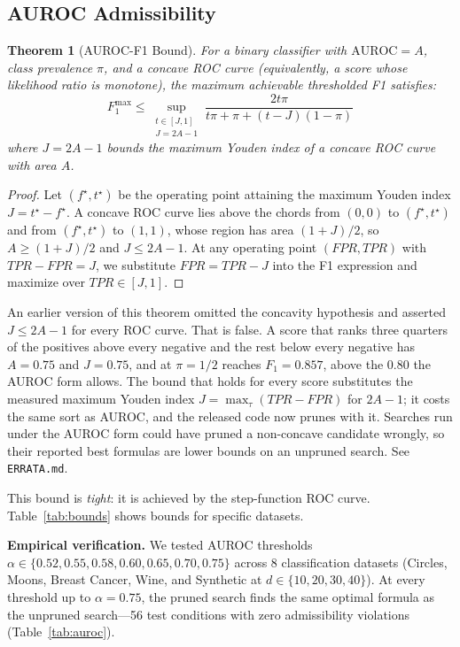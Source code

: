 \documentclass[journal]{IEEEtran}
\newtheorem{theorem}{Theorem}
\begin{document}
\subsection{AUROC Admissibility}

\begin{theorem}[AUROC-F1 Bound]
\label{thm:auroc_f1}
For a binary classifier with $\mathrm{AUROC} = A$, class
prevalence $\pi$, and a \emph{concave} ROC curve (equivalently, a score
whose likelihood ratio is monotone), the maximum achievable thresholded
F1 satisfies:
\[
F_1^{\max} \leq \sup_{\substack{t \in [J, 1] \\ J = 2A-1}}
\frac{2 t \pi}{t \pi + \pi + (t - J)(1 - \pi)}
\]
where $J = 2A - 1$ bounds the maximum Youden index of a concave ROC
curve with area $A$.
\end{theorem}

\begin{proof}
Let $(f^\star, t^\star)$ be the operating point attaining the maximum
Youden index $J = t^\star - f^\star$. A concave ROC curve lies above the
chords from $(0,0)$ to $(f^\star,t^\star)$ and from $(f^\star,t^\star)$ to
$(1,1)$, whose region has area $(1+J)/2$, so $A \ge (1+J)/2$ and $J \le
2A-1$. At any operating point
$(FPR, TPR)$ with $TPR - FPR = J$, we substitute $FPR = TPR - J$
into the F1 expression and maximize over $TPR \in [J, 1]$.
\end{proof}

\begin{remark}[Correction, 2026-09-03]
An earlier version of this theorem omitted the concavity hypothesis and
asserted $J \le 2A-1$ for every ROC curve. That is false. A score that
ranks three quarters of the positives above every negative and the rest
below every negative has $A = 0.75$ and $J = 0.75$, and at $\pi = 1/2$
reaches $F_1 = 0.857$, above the $0.80$ the AUROC form allows. The bound
that holds for every score substitutes the measured maximum Youden index
$J = \max_\tau(TPR-FPR)$ for $2A-1$; it costs the same sort as AUROC, and
the released code now prunes with it. Searches run under the AUROC form
could have pruned a non-concave candidate wrongly, so their reported best
formulas are lower bounds on an unpruned search. See \texttt{ERRATA.md}.
\end{remark}

This bound is \emph{tight}: it is achieved by the step-function ROC
curve. Table~\ref{tab:bounds} shows bounds for specific datasets.

\textbf{Empirical verification.} We tested AUROC thresholds
$\alpha \in \{0.52, 0.55, 0.58, 0.60, 0.65, 0.70, 0.75\}$ across
8 classification datasets (Circles, Moons, Breast Cancer, Wine, and
Synthetic at $d \in \{10, 20, 30, 40\}$). At every threshold up to
$\alpha = 0.75$, the pruned search finds the same optimal formula
as the unpruned search---56 test conditions with zero admissibility
violations (Table~\ref{tab:auroc}).
\end{document}
